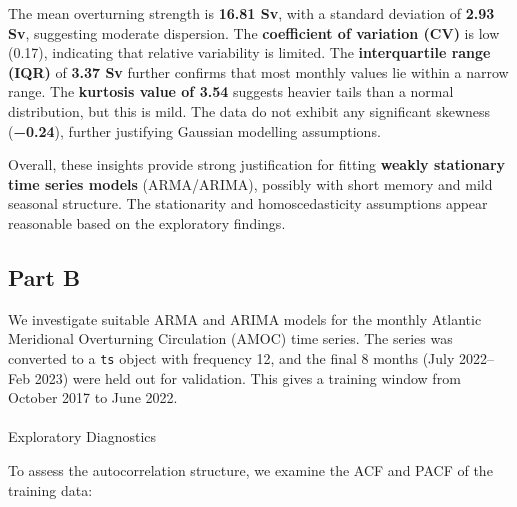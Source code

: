 \documentclass[
  11pt,
]{article}
\makeatletter
\let\oldparagraph\paragraph
\renewcommand{\paragraph}{
    \@ifstar
      \xxxParagraphStar
      \xxxParagraphNoStar
  }
\newcommand{\xxxParagraphStar}[1]{\oldparagraph*{#1}\mbox{}}
\newcommand{\xxxParagraphNoStar}[1]{\oldparagraph{#1}\mbox{}}
\makeatother
\begin{document}
The mean overturning strength is \textbf{16.81 Sv}, with a standard
deviation of \textbf{2.93 Sv}, suggesting moderate dispersion. The
\textbf{coefficient of variation (CV)} is low (0.17), indicating that
relative variability is limited. The \textbf{interquartile range (IQR)}
of \textbf{3.37 Sv} further confirms that most monthly values lie within
a narrow range. The \textbf{kurtosis value of 3.54} suggests heavier
tails than a normal distribution, but this is mild. The data do not
exhibit any significant skewness (\textbf{−0.24}), further justifying
Gaussian modelling assumptions.

Overall, these insights provide strong justification for fitting
\textbf{weakly stationary time series models} (ARMA/ARIMA), possibly
with short memory and mild seasonal structure. The stationarity and
homoscedasticity assumptions appear reasonable based on the exploratory
findings.

\subsection{Part B}\label{part-b}

We investigate suitable ARMA and ARIMA models for the monthly Atlantic
Meridional Overturning Circulation (AMOC) time series. The series was
converted to a \texttt{ts} object with frequency 12, and the final 8
months (July 2022--Feb 2023) were held out for validation. This gives a
training window from October 2017 to June 2022.

\paragraph{Exploratory Diagnostics}\label{exploratory-diagnostics}

To assess the autocorrelation structure, we examine the ACF and PACF of
the training data:
\end{document}
